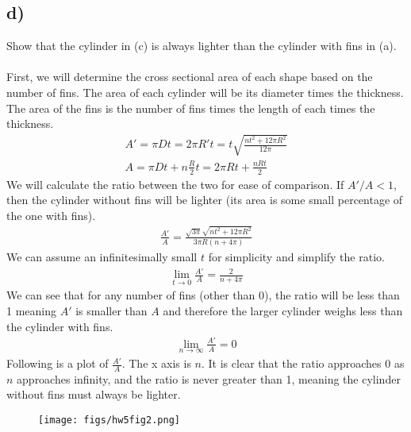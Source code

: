 \documentclass[12 pt]{article}
\begin{document}
\subsection*{d)}
Show that the cylinder in (c) is always lighter than the cylinder with fins in (a). \\ \\
First, we will determine the cross sectional area of each shape based on the number of fins. The area of each cylinder
will be its diameter times the thickness. The area of the fins is the number of fins times the length of each times the
thickness.
\begin{align*}
    A'=\pi Dt=2\pi R't=t\sqrt{\frac{nt^2+12\pi R^2}{12\pi }} \\
    A=\pi Dt+n\frac{R}{2}t=2\pi Rt+\frac{nRt}{2}
\end{align*}
We will calculate the ratio between the two for ease of comparison. If $A'/A<1$, then the cylinder without fins will be
lighter (its area is some small percentage of the one with fins).
\begin{align*}
    \frac{A'}{A}=\frac{\sqrt{3\pi}\sqrt{nt^2+12\pi R^2}}{3\pi R(n+4\pi)}
\end{align*}
We can assume an infinitesimally small $t$ for simplicity and simplify the ratio.
\begin{align*}
    \lim_{t\rightarrow 0}\frac{A'}{A}=\frac{2}{n+4\pi}
\end{align*} 
We can see that for any number of fins (other than 0), the ratio will be less than 1 meaning $A'$ is smaller than $A$
and therefore the larger cylinder weighs less than the cylinder with fins.
\begin{align*}
    \lim_{n\rightarrow \infty}\frac{A'}{A}=0
\end{align*}
Following is a plot of $\frac{A'}{A}$. The x axis is $n$. It is clear that the ratio approaches 0 as $n$ approaches
infinity, and the ratio is never greater than 1, meaning the cylinder without fins must always be lighter.
\begin{figure}[H]
    \centering
    \texttt{[image: figs/hw5fig2.png]}
\end{figure} \par
\end{document}

